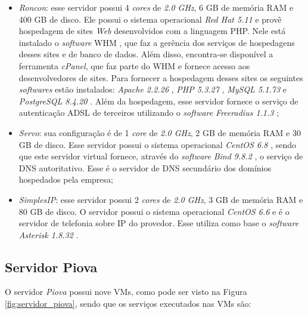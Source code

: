 \begin{itemize}
 \item \textit{Roncon}: esse servidor possui 4 \textit{cores} de \textit{2.0 GHz}, 6 GB de memória \ac{RAM} e 400 GB de disco. 
 Ele possui o sistema operacional \textit{Red Hat 5.11} \cite{redhat} e provê hospedagem de sites \textit{Web} desenvolvidos com a linguagem 
 \ac{PHP}. Nele está instalado o \textit{software} \ac{WHM} \cite{whm}, que faz a gerência dos serviços de hospedagens desses sites e de banco de 
 dados. Além disso, encontra-se disponível a ferramenta \textit{cPanel}, que faz parte do \ac{WHM} e fornece acesso aos desenvolvedores de
 sites. Para fornecer a hospedagem desses sites os seguintes \textit{softwares} estão instalados: \textit{Apache 2.2.26} \cite{apache}, 
 \textit{\ac{PHP} 5.3.27} \cite{php}, \textit{MySQL 5.1.73} \cite{mysql} e \textit{PostgreSQL 8.4.20} \cite{postgres}.
 Além da hospedagem, esse servidor fornece o serviço de autenticação \ac{ADSL} \cite{tanenbaum2011} de terceiros utilizando o \textit{software} 
 \textit{Freeradius 1.1.3} \cite{freeradius};
 
 \item \textit{Servo}: sua configuração é de 1 \textit{core} de \textit{2.0 GHz}, 2 GB de memória \ac{RAM} e 30 GB de disco. 
 Esse servidor possui o sistema operacional \textit{CentOS 6.8} \cite{centos}, sendo que este servidor virtual fornece, através do \textit{software} 
 \textit{Bind 9.8.2} \cite{bind}, o serviço de \ac{DNS} autoritativo. Esse é o servidor de \ac{DNS} secundário dos domínios hospedados pela empresa;
 
 \item \textit{SimplesIP}: esse servidor possui 2 \textit{cores} de \textit{2.0 GHz}, 3 GB de memória \ac{RAM} e 80 GB de disco. 
 O servidor possui o sistema operacional \textit{CentOS 6.6} \cite{centos} e é o servidor de telefonia sobre \ac{IP} do provedor. Esse utiliza 
 como base o \textit{software} \textit{Asterisk 1.8.32} \cite{asterisk}.
\end{itemize}

\subsection{Servidor Piova}
\label{section:serv_piova}

O servidor \textit{Piova} possui nove \ac{VM}s, como pode ser visto na Figura \ref{fig:servidor_piova}, sendo que os serviços executados nas 
\ac{VM}s são:

